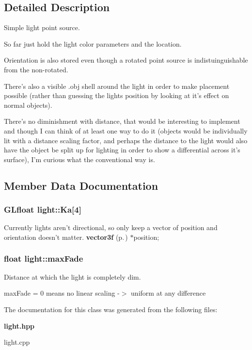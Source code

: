 \subsection{Detailed Description}
Simple light point source.

So far just hold the light color parameters and the location.

Orientation is also stored even though a rotated point source is indistuinguishable from the non-rotated.

There's also a visible .obj shell around the light in order to  make placement possible (rather than guessing the lights position by looking at it's effect on normal objects).

There's no diminishment with distance, that would be interesting to implement and though I can think of at least one way to do it  (objects would be individually lit with a distance scaling factor, and perhaps the distance to the light would also have the object be split up for lighting in order to show a differential across it's surface), I'm curious what the conventional way is. 



\subsection{Member Data Documentation}
\subsubsection{\setlength{\rightskip}{0pt plus 5cm}GLfloat light::Ka[4]}\label{classlight_m4}


Currently lights aren't directional, so only keep a vector of position and orientation doesn't matter. {\bf vector3f} {\rm (p.\,\pageref{classvector3f})} $\ast$position; 
\subsubsection{\setlength{\rightskip}{0pt plus 5cm}float light::max\-Fade}\label{classlight_m1}


Distance at which the light is completely dim.

max\-Fade = 0 means no linear scaling -$>$ uniform at any difference 

The documentation for this class was generated from the following files:\begin{CompactItemize}
\item 
{\bf light.hpp}\item 
light.cpp\end{CompactItemize}
